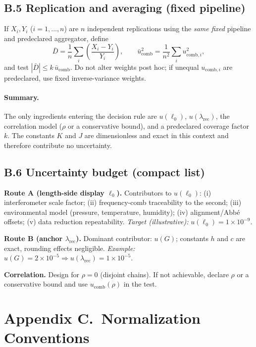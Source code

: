 \documentclass[11pt]{article}
\theoremstyle{plain}
\theoremstyle{definition}
\theoremstyle{remark}
\begin{document}
\subsection*{B.5 Replication and averaging (fixed pipeline)}
If \(X_i,Y_i\) (\(i=1,\dots,n\)) are \(n\) independent replications using the \emph{same fixed} pipeline and predeclared aggregator, define
\[
\bar{D}=\frac{1}{n}\sum_i \left(\frac{X_i-Y_i}{Y_i}\right),\qquad
\bar{u}_{\mathrm{comb}}^2=\frac{1}{n^2}\sum_i u_{\mathrm{comb},i}^2,
\]
and test \(|\bar{D}| \le k\,\bar{u}_{\mathrm{comb}}\). Do not alter weights post hoc; if unequal \(u_{\mathrm{comb},i}\) are predeclared, use fixed inverse-variance weights.

\paragraph{Summary.}
The only ingredients entering the decision rule are \(u(\ell_0)\), \(u(\lambda_{\mathrm{rec}})\), the correlation model (\(\rho\) or a conservative bound), and a predeclared coverage factor \(k\). The constants \(K\) and \(J\) are dimensionless and exact in this context and therefore contribute no uncertainty.

\subsection*{B.6 Uncertainty budget (compact list)}
\textbf{Route A (length-side display \(\ell_0\)).} Contributors to \(u(\ell_0)\): (i) interferometer scale factor; (ii) frequency-comb traceability to the second; (iii) environmental model (pressure, temperature, humidity); (iv) alignment/Abbé offsets; (v) data reduction repeatability. \emph{Target (illustrative):} \(u(\ell_0)=1\times10^{-9}\).

\textbf{Route B (anchor \(\lambda_{\mathrm{rec}}\)).} Dominant contributor: \(u(G)\); constants \(h\) and \(c\) are exact, rounding effects negligible. \emph{Example:} \(u(G)=2\times10^{-5}\Rightarrow u(\lambda_{\mathrm{rec}})=1\times10^{-5}\).

\textbf{Correlation.} Design for \(\rho=0\) (disjoint chains). If not achievable, declare \(\rho\) or a conservative bound and use \(u_{\mathrm{comb}}(\rho)\) in the test.

\section*{Appendix C.\ Normalization Conventions}
\end{document}
